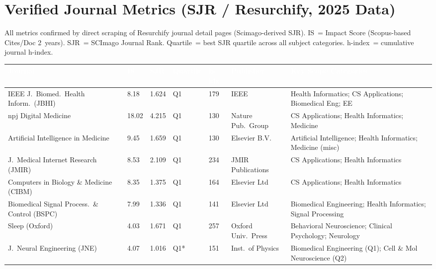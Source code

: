 \documentclass[a4paper,11pt]{article}
\newcommand{\hdr}[1]{\textbf{\textcolor{white}{#1}}}
\begin{document}
\section{Verified Journal Metrics (SJR / Resurchify, 2025 Data)}

All metrics confirmed by direct scraping of Resurchify journal detail pages
(Scimago-derived SJR). IS~= Impact Score (Scopus-based Cites/Doc 2~years).
SJR~= SCImago Journal Rank. Quartile~= best SJR quartile across all subject categories.
h-index~= cumulative journal h-index.

\medskip
\noindent
\begin{tabular}{L{3.5cm}C{0.85cm}C{0.85cm}C{1.1cm}C{1.0cm}L{2.1cm}L{4.0cm}}
  \toprule
  \hdr{Journal} &
  \hdr{IS} &
  \hdr{SJR} &
  \hdr{Quartile} &
  \hdr{h-idx} &
  \hdr{Publisher} &
  \hdr{Key Scope Categories} \\
  \midrule
  IEEE J.\ Biomed.\ Health Inform.\ (JBHI)
    & 8.18 & 1.624 & Q1 & 179
    & IEEE
    & Health Informatics; CS Applications; Biomedical Eng; EE \\
  npj Digital Medicine
    & 18.02 & 4.215 & Q1 & 130
    & Nature Pub.\ Group
    & CS Applications; Health Informatics; Medicine \\
  Artificial Intelligence in Medicine
    & 9.45 & 1.659 & Q1 & 130
    & Elsevier B.V.
    & Artificial Intelligence; Health Informatics; Medicine (misc) \\
  J.\ Medical Internet Research (JMIR)
    & 8.53 & 2.109 & Q1 & 234
    & JMIR Publications
    & CS Applications; Health Informatics \\
  Computers in Biology \& Medicine (CIBM)
    & 8.35 & 1.375 & Q1 & 164
    & Elsevier Ltd
    & CS Applications; Health Informatics \\
  Biomedical Signal Process.\ \& Control (BSPC)
    & 7.99 & 1.336 & Q1 & 141
    & Elsevier Ltd
    & Biomedical Engineering; Health Informatics; Signal Processing \\
  Sleep (Oxford)
    & 4.03 & 1.671 & Q1 & 257
    & Oxford Univ.\ Press
    & Behavioral Neuroscience; Clinical Psychology; Neurology \\
  J.\ Neural Engineering (JNE)
    & 4.07 & 1.016 & Q1* & 151
    & Inst.\ of Physics
    & Biomedical Engineering (Q1); Cell \& Mol Neuroscience (Q2) \\
  \bottomrule
\end{tabular}
\end{document}
